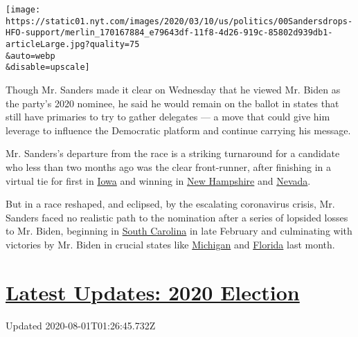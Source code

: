 \texttt{[image: https://static01.nyt.com/images/2020/03/10/us/politics/00Sandersdrops-HFO-support/merlin\_170167884\_e79643df-11f8-4d26-919c-85802d939db1-articleLarge.jpg?quality=75\\\&auto=webp\\\&disable=upscale]}

Though Mr. Sanders made it clear on Wednesday that he viewed Mr. Biden
as the party's 2020 nominee, he said he would remain on the ballot in
states that still have primaries to try to gather delegates --- a move
that could give him leverage to influence the Democratic platform and
continue carrying his message.

Mr. Sanders's departure from the race is a striking turnaround for a
candidate who less than two months ago was the clear front-runner, after
finishing in a virtual tie for first in
\href{https://www.nytimes.com/2020/02/07/us/politics/who-won-iowa-caucuses.html}{Iowa}
and winning in
\href{https://www.nytimes.com/2020/02/11/us/politics/bernie-sanders-new-hampshire-primary.html}{New
Hampshire} and
\href{https://www.nytimes.com/2020/02/22/us/politics/bernie-sanders-nevada-caucus.html}{Nevada}.

But in a race reshaped, and eclipsed, by the escalating coronavirus
crisis, Mr. Sanders faced no realistic path to the nomination after a
series of lopsided losses to Mr. Biden, beginning in
\href{https://www.nytimes.com/2020/02/29/us/politics/joe-biden-south-carolina-primary.html}{South
Carolina} in late February and culminating with victories by Mr. Biden
in crucial states like
\href{https://www.nytimes.com/2020/03/10/us/politics/michigan-primary-results.html}{Michigan}
and
\href{https://www.nytimes.com/2020/03/17/us/politics/biden-florida-illinois-primary.html}{Florida}
last month.

\hypertarget{latest-updates-2020-election}{%
\section{\texorpdfstring{\href{https://www.nytimes.com/2020/07/31/us/elections/biden-vs-trump.html?action=click\&pgtype=Article\&state=default\&region=MAIN_CONTENT_1\&context=storylines_live_updates}{Latest
Updates: 2020
Election}}{Latest Updates: 2020 Election}}\label{latest-updates-2020-election}}

Updated 2020-08-01T01:26:45.732Z

